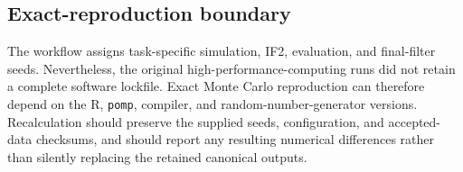\subsection{Exact-reproduction boundary}

The workflow assigns task-specific simulation, IF2, evaluation, and final-filter
seeds.  Nevertheless, the original high-performance-computing runs did not
retain a complete software lockfile.  Exact Monte Carlo reproduction can
therefore depend on the R, \texttt{pomp}, compiler, and random-number-generator
versions.  Recalculation should preserve the supplied seeds, configuration, and
accepted-data checksums, and should report any resulting numerical differences
rather than silently replacing the retained canonical outputs.
